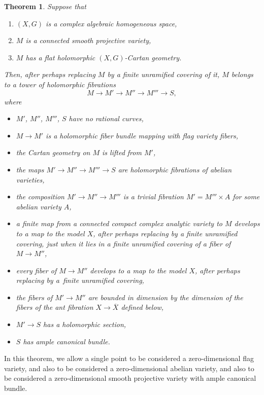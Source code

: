 \documentclass[pdftex]{sigma}
\numberwithin{equation}{section}
\newtheorem{Theorem}{Theorem}[section]
\begin{document}
\begin{Theorem}\label{theorem:main}
Suppose that
\begin{enumerate}\itemsep=0pt
\item[$(1)$]
$(X, G)$ is a complex algebraic homogeneous space,
\item[$(2)$]
$M$ is a connected smooth projective variety,
\item[$(3)$]
$M$ has a flat holomorphic $(X, G)$-Cartan geometry.
\end{enumerate}
Then, after perhaps replacing $M$ by a finite unramified covering of it, $M$ belongs to a tower of holomorphic fibrations
\[M\to M'\to M''\to M'''\to S,\] where
\begin{itemize}\itemsep=0pt
\item
$M'$, $M''$, $M'''$, $S$ have no rational curves,
\item
$M\to M'$ is a holomorphic fiber bundle mapping with flag variety fibers,
\item
the Cartan geometry on $M$ is lifted from $M'$,
\item
the maps $M'\to M'' \to M'''\to S$ are holomorphic fibrations of abelian varieties,
\item
the composition $M'\to M''\to M'''$ is a trivial fibration $M' = M'''\times A$ for some abelian
variety $A$,
\item
a finite map from a connected compact complex analytic variety to $M$ develops to a map to the model $X$, after perhaps replacing by a finite unramified covering, just when it lies in a finite unramified
covering of a fiber of $M\to M''$,
\item
every fiber of $M\to M''$ develops to a map to the model $X$, after perhaps replacing by a~finite unramified covering,
\item
the fibers of $M'\to M''$ are bounded in dimension by the dimension of the fibers of the ant fibration $X \longrightarrow
\overline{X}$ defined below,
\item
$M'\to S$ has a holomorphic section,
\item
$S$ has ample canonical bundle.
\end{itemize}
\end{Theorem}

In this theorem, we allow a single point to be considered a zero-dimensional flag variety, and also to be considered a zero-dimensional abelian variety, and also to be considered a zero-dimensional smooth projective variety with ample canonical bundle.
\end{document}
